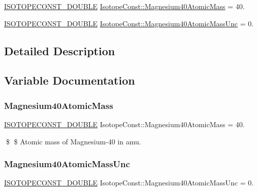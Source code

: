 \begin{DoxyCompactItemize}
\item 
\mbox{\hyperlink{group___isotope_const-_macros_ga8f45a7272ce02c0b4c65c44636ed719a}{I\+S\+O\+T\+O\+P\+E\+C\+O\+N\+S\+T\+\_\+\+D\+O\+U\+B\+LE}} \mbox{\hyperlink{group___isotope_const-_magnesium-_mg40_gafd261b2333255202dc6de2143208bf1d}{Isotope\+Const\+::\+Magnesium40\+Atomic\+Mass}} = 40.
\item 
\mbox{\hyperlink{group___isotope_const-_macros_ga8f45a7272ce02c0b4c65c44636ed719a}{I\+S\+O\+T\+O\+P\+E\+C\+O\+N\+S\+T\+\_\+\+D\+O\+U\+B\+LE}} \mbox{\hyperlink{group___isotope_const-_magnesium-_mg40_gab6f9966d0d3ddaaf24855a52c9591df3}{Isotope\+Const\+::\+Magnesium40\+Atomic\+Mass\+Unc}} = 0.
\end{DoxyCompactItemize}


\subsection{Detailed Description}


\subsection{Variable Documentation}
\mbox{\label{group___isotope_const-_magnesium-_mg40_gafd261b2333255202dc6de2143208bf1d}} 
\subsubsection{\texorpdfstring{Magnesium40\+Atomic\+Mass}{Magnesium40AtomicMass}}
{\footnotesize\ttfamily \mbox{\hyperlink{group___isotope_const-_macros_ga8f45a7272ce02c0b4c65c44636ed719a}{I\+S\+O\+T\+O\+P\+E\+C\+O\+N\+S\+T\+\_\+\+D\+O\+U\+B\+LE}} Isotope\+Const\+::\+Magnesium40\+Atomic\+Mass = 40.}

\$ \$ Atomic mass of Magnesium-\/40 in amu. \mbox{\label{group___isotope_const-_magnesium-_mg40_gab6f9966d0d3ddaaf24855a52c9591df3}} 
\subsubsection{\texorpdfstring{Magnesium40\+Atomic\+Mass\+Unc}{Magnesium40AtomicMassUnc}}
{\footnotesize\ttfamily \mbox{\hyperlink{group___isotope_const-_macros_ga8f45a7272ce02c0b4c65c44636ed719a}{I\+S\+O\+T\+O\+P\+E\+C\+O\+N\+S\+T\+\_\+\+D\+O\+U\+B\+LE}} Isotope\+Const\+::\+Magnesium40\+Atomic\+Mass\+Unc = 0.}

